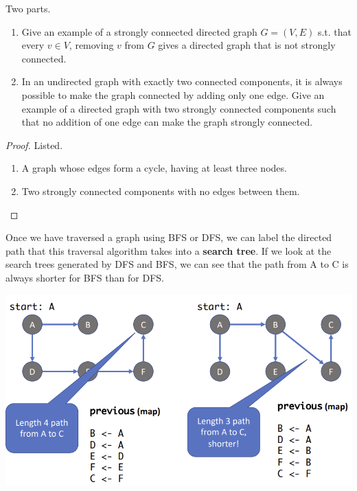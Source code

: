 \documentclass{article}
\begin{document}
    \begin{exercise}
      Two parts. 
      \begin{enumerate}
        \item Give an example of a strongly connected directed graph $G = (V, E)$ s.t. that every $v \in V$, removing $v$ from $G$ gives a directed graph that is not strongly connected. 
        \item In an undirected graph with exactly two connected components, it is always possible to make the graph connected by adding only one edge. Give an example of a directed graph with two strongly connected components such that no addition of one edge can make the graph strongly connected.
      \end{enumerate}
    \end{exercise}
    \begin{proof}
      Listed. 
      \begin{enumerate}
        \item A graph whose edges form a cycle, having at least three nodes.
        \item Two strongly connected components with no edges between them.
      \end{enumerate}
    \end{proof} 

    \begin{definition}
      Once we have traversed a graph using BFS or DFS, we can label the directed path that this traversal algorithm takes into a \textbf{search tree}. If we look at the search trees generated by DFS and BFS, we can see that the path from A to C is always shorter for BFS than for DFS. 
      \begin{center}
        \includegraphics[scale=0.4]{img/search_trees.png}
      \end{center}
    \end{definition}
\end{document}
